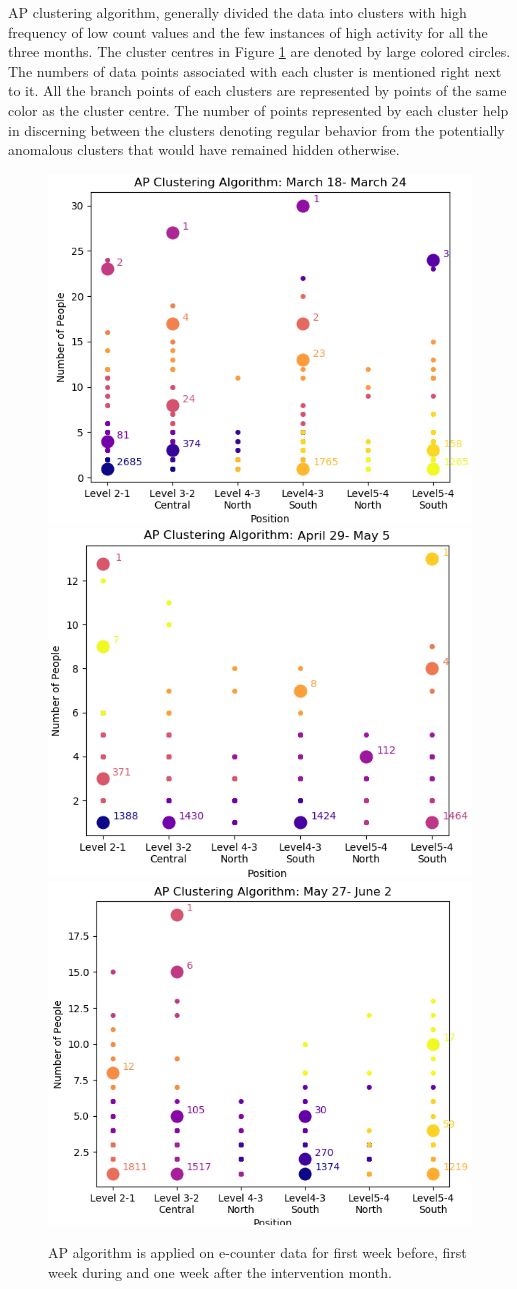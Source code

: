 AP clustering algorithm, generally divided the data into clusters with high frequency of low count values and the few instances of high activity for all the three months. The cluster centres in Figure \ref{oneweek} are denoted by large colored circles. The numbers of data points  associated with each cluster is mentioned right next to it. All the branch points of each clusters are represented by points of the same color as the cluster centre. The number of points represented by each cluster help in discerning between the clusters denoting regular behavior from the potentially anomalous clusters that would have remained hidden otherwise. 

\begin{figure}[!t]
\centering
\includegraphics[width=.49\textwidth]{image/Chapters/Chapter6/ApFirstWeekBeforeInt.png}
    \includegraphics[width=.49\textwidth]{image/Chapters/Chapter6/ApFirstWeekIntervention.png}\hfill\centering
    \includegraphics[width=.5\textwidth]{image/Chapters/Chapter6/ApFirstWeekAfterInt.png}
    \\[\smallskipamount]
\caption{AP algorithm is applied on e-counter data for first week before, first week during and one week after the intervention month. } 
\label{oneweek}
\end{figure}
 
